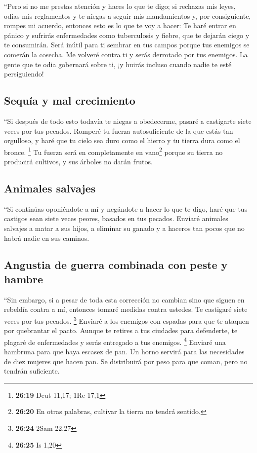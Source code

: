  ``Pero si no me prestas atención y haces lo que te digo;
 si rechazas mis leyes, odias mis reglamentos y te niegas
a seguir mis mandamientos y, por consiguiente, rompes mi acuerdo,
 entonces esto es lo que te voy a hacer: Te haré entrar
en pánico y sufrirás enfermedades como tuberculosis y fiebre, que te
dejarán ciego y te consumirán. Será inútil para ti sembrar en tus campos
porque tus enemigos se comerán la cosecha.  Me volveré
contra ti y serás derrotado por tus enemigos. La gente que te odia
gobernará sobre ti, ¡y huirás incluso cuando nadie te esté persiguiendo!

\hypertarget{sequuxeda-y-mal-crecimiento}{%
\subsection{Sequía y mal
crecimiento}\label{sequuxeda-y-mal-crecimiento}}

 ``Si después de todo esto todavía te niegas a
obedecerme, pasaré a castigarte siete veces por tus pecados.
 Romperé tu fuerza autosuficiente de la que estás tan
orgulloso, y haré que tu cielo sea duro como el hierro y tu tierra dura
como el bronce. \footnote{\textbf{26:19} Deut 11,17; 1Re 17,1}
 Tu fuerza será en completamente en vano\footnote{\textbf{26:20}
  En otras palabras, cultivar la tierra no tendrá sentido.} porque su
tierra no producirá cultivos, y sus árboles no darán frutos.

\hypertarget{animales-salvajes}{%
\subsection{Animales salvajes}\label{animales-salvajes}}

 ``Si continúas oponiéndote a mí y negándote a hacer lo
que te digo, haré que tus castigos sean siete veces peores, basados en
tus pecados.  Enviaré animales salvajes a matar a sus
hijos, a eliminar su ganado y a haceros tan pocos que no habrá nadie en
sus caminos.

\hypertarget{angustia-de-guerra-combinada-con-peste-y-hambre}{%
\subsection{Angustia de guerra combinada con peste y
hambre}\label{angustia-de-guerra-combinada-con-peste-y-hambre}}

 ``Sin embargo, si a pesar de toda esta corrección no
cambian sino que siguen en rebeldía contra a mí, 
entonces tomaré medidas contra ustedes. Te castigaré siete veces por tus
pecados. \footnote{\textbf{26:24} 2Sam 22,27}  Enviaré a
los enemigos con espadas para que te ataquen por quebrantar el pacto.
Aunque te retires a tus ciudades para defenderte, te plagaré de
enfermedades y serás entregado a tus enemigos. \footnote{\textbf{26:25}
  Is 1,20}  Enviaré una hambruna para que haya escasez de
pan. Un horno servirá para las necesidades de diez mujeres que hacen
pan. Se distribuirá por peso para que coman, pero no tendrán suficiente.

